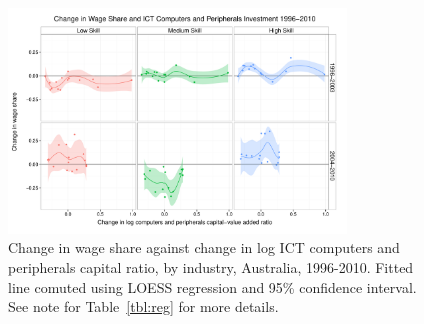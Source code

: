 \begin{figure}
  \centering
  \includegraphics[width=0.8\textwidth]{../figure/wage_share_peripherals_skill_split.pdf}
  \caption{Change in wage share against change in log ICT computers and peripherals capital ratio, by industry, Australia, 1996-2010. Fitted line comuted using LOESS regression and 95\% confidence interval.
    See note for Table~\ref{tbl:reg} for more details.
  }
  \label{fig:periph}
\end{figure}

